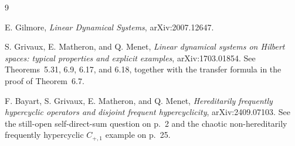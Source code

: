 \documentclass[11pt]{article}
\begin{document}
\begin{thebibliography}{9}
\raggedright
{}
E. Gilmore,
\emph{Linear Dynamical Systems}, arXiv:2007.12647.

S. Grivaux, E. Matheron, and Q. Menet,
\emph{Linear dynamical systems on Hilbert spaces: typical properties and
explicit examples}, arXiv:1703.01854.  See Theorems~5.31, 6.9, 6.17,
and 6.18, together with the transfer formula in the proof of Theorem~6.7.

F. Bayart, S. Grivaux, E. Matheron, and Q. Menet,
\emph{Hereditarily frequently hypercyclic operators and disjoint frequent
hypercyclicity}, arXiv:2409.07103.  See the still-open self-direct-sum question
on p.~2 and the chaotic non-hereditarily frequently hypercyclic
\(C_{+,1}\) example on p.~25.
\end{thebibliography}
\end{document}
